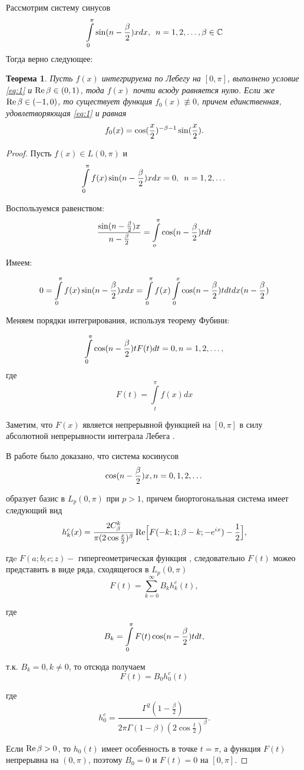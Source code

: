 ﻿\documentclass[oneside, final, 14pt]{extreport}
\newtheorem{theorem}{Теорема}
\begin{document}
	
	Рассмотрим систему синусов $$\int\limits_0^{\pi}\sin(n - \frac{\beta}{2})xdx, \enspace n = 1, 2, \dots, \beta\in\mathbb{C}$$
	Тогда верно следующее:
	\begin{theorem}
		Пусть $f(x)$ интегрируема по Лебегу на $[0, \pi]$, выполнено условие
		\eqref{eq:1} и \thinspace $\operatorname{Re}\beta \in (0, 1)$, 
		тода $f(x)$ почти всюду равняется нулю. Если же \thinspace  
		$\operatorname{Re}\beta \in (-1, 0)$, то существует функция $f_0(x) \not\equiv 0$, 
		причем единственная, удовлетворяющая \eqref{eq:1} и равная $$f_0(x) = \cos(\frac{x}{2})^{-\beta-1}\sin(\frac{x}{2}).$$
	\end{theorem}
	
	
	\begin{proof}
		Пусть $f(x) \in L(0, \pi)$ и $$\int\limits_0^{\pi}f(x)\sin(n - \frac{\beta}{2})xdx = 0, \enspace n = 1, 2, \dots$$
		
		Воспользуемся равенством:
		$$
			\frac{\sin(n - \frac{\beta}{2})x}{n - \frac{\beta}{2}} = \int\limits_o^\pi\cos(n - \frac{\beta}{2})tdt
		$$
		
		Имеем:
		
		$$
			 0 = \int\limits_0^\pi f(x)\sin(n - \frac{\beta}{2})xdx = \int\limits_0^\pi f(x) \int\limits_0^x\cos(n - \frac{\beta}{2})tdtdx(n - \frac{\beta}{2})
		$$
		
		Меняем порядки интегрирования, используя теорему Фубини:
	
		$$
			\int\limits_0^\pi\cos(n - \frac{\beta}{2})tF(t)dt = 0, n = 1, 2, \dots,
		$$
		где
		$$
			F(t) = \int\limits_t^\pi f(x) dx
		$$
		
		Заметим, что $F(x)$ является непрерывной функцией на $[0, \pi]$ в силу абсолютной непрерывности 
		интеграла Лебега \cite{kolmogorov}.
		
		В работе \cite{moiseev-dan} было доказано, что система косинусов
		$$
			\cos(n - \frac{\beta}{2})x, n = 0, 1, 2, \dots
		$$
		
		образует базис в $L_p(0, \pi)$ при $p > 1$, причем биортогональная система имеет следующий вид
		$$
			h^c_k(x) = \frac{2C^k_\beta}{\pi(2\cos\frac{x}{2})^\beta}
			\operatorname{Re}\Bigl[F(-k; 1; \beta - k; -e^{ix}) - \frac{1}{2}\Bigr],
		$$
		
		гдe $F(a; b; c; z) - $ гипергеометрическая функция \cite{bateman}, следовательно $F(t)$ можео представить
		в виде ряда, сходящегося в $L_p(0, \pi)$
		$$
			F(t) = \sum\limits^\infty_{k = 0}B_k h^c_k(t), 
		$$
		
		где 
		$$
			B_k = \int\limits_0^\pi F(t) \cos(n - \frac{\beta}{2})tdt,
		$$
		
		т.к. $B_k = 0, k \neq 0$, то отсюда получаем 
		$$
			F(t) = B_0 h^c_0(t)
		$$
		
		где 
		$$
			h^c_0 = \frac{\Gamma^2(1 - \frac{\beta}{2})}{2\pi \Gamma(1- \beta)(2\cos\frac{t}{2})^\beta}.
		$$
		
		Если $\operatorname{Re}\beta > 0$, то $h_0(t)$ имеет особенность в точке $t = \pi$, а функция $F(t)$ непрерывна на $(0, \pi)$,
		поэтому $B_0 = 0$ и $F(t) = 0$ на $[0, \pi]$.
		

\end{proof}
\end{document}
